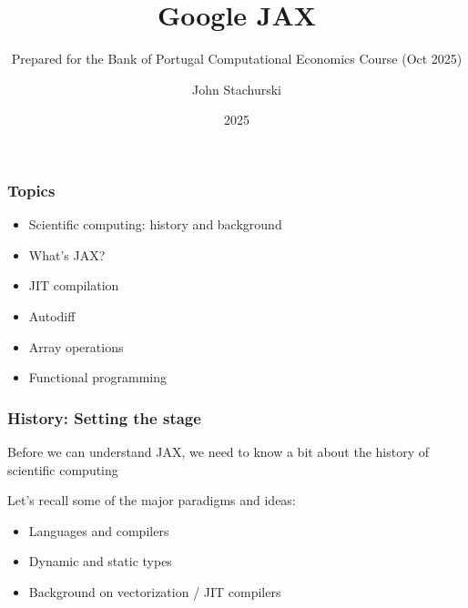 

\title{Google JAX}
\subtitle{Prepared for the Bank of Portugal Computational Economics Course (Oct 2025)}

\author{John Stachurski}


\date{2025}




\begin{frame}
  \titlepage
\end{frame}



\begin{frame}
    \frametitle{Topics}

    \begin{itemize}
        \item Scientific computing: history and background
        \vspace{0.5em}
        \item What's JAX?
        \vspace{0.5em}
        \item JIT compilation
        \vspace{0.5em}
        \item Autodiff
        \vspace{0.5em}
        \item Array operations
        \vspace{0.5em}
        \item Functional programming
    \end{itemize}

\end{frame}


\begin{frame}
    \frametitle{History: Setting the stage}

    Before we can understand JAX, we need to know a bit about the history of scientific
    computing

    \vspace{0.5em}
    Let's recall some of the major paradigms and ideas:

    \vspace{0.5em}
    \begin{itemize}
        \item Languages and compilers
    \vspace{0.5em}
        \item Dynamic and static types
    \vspace{0.5em}
        \item Background on vectorization / JIT compilers
    \end{itemize}

\end{frame}
    


